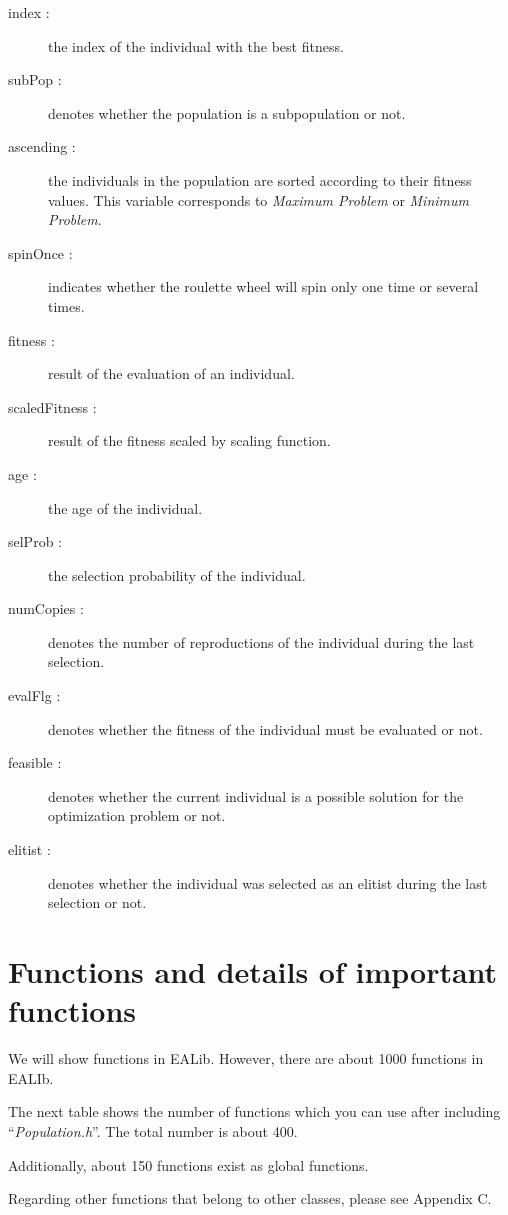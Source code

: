 \documentclass[twocolumn]{article}
\begin{document}
{\small 
\begin{description}
\item[index :] the index of the individual with the best fitness.
\item[subPop :] denotes whether the population is a subpopulation or
not.
\item[ascending :] the individuals in the population are sorted
according to their fitness values. This variable corresponds to {\em
Maximum Problem} or {\em Minimum Problem}.
\item[spinOnce :] indicates whether the roulette wheel will spin only
one time or several times.
\item[fitness :] result of the evaluation of an individual.
\item[scaledFitness :] result of the fitness scaled by scaling
function.
\item[age :] the age of the individual.
\item[selProb :] the selection probability of the individual.
\item[numCopies :] denotes the number of reproductions of the
individual during the last selection.
\item[evalFlg :] denotes whether the fitness of the individual must
be evaluated or not.
\item[feasible :] denotes whether the current individual is a
possible solution for the optimization problem or not.
\item[elitist :] denotes whether the individual was selected as an
elitist during the last selection or not.
\end{description}
}

\section{Functions and details of important functions}

\noindent
We will show functions in EALib. However, there are about 1000
functions in EALIb.

\noindent
The next table shows the number of functions which you can use after
including ``{\em Population.h}''. The total number is about 400.

\noindent
Additionally, about 150 functions exist as global functions.

\noindent
Regarding other functions that belong to other classes, please see
Appendix C.
\end{document}
